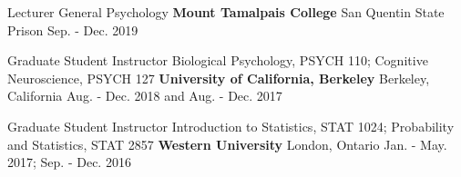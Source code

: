

\begin{cventries}

  \cventry
    {Lecturer} %
    {General Psychology} %
    {\textbf{Mount Tamalpais College}} %
    {San Quentin State Prison} %
    {Sep. - Dec. 2019} %
    
  \cventry
	{Graduate Student Instructor} %
	{Biological Psychology, PSYCH 110; Cognitive Neuroscience, PSYCH 127} %
    {\textbf{University of California, Berkeley}} %
    {Berkeley, California} %
    {Aug. - Dec. 2018 and Aug. - Dec. 2017} %
    
  \cventry
	{Graduate Student Instructor} %
	{Introduction to Statistics, STAT 1024; Probability and Statistics, STAT 2857} %
    {\textbf{Western University}} %
    {London, Ontario} %
    {Jan. - May. 2017; Sep. - Dec. 2016} %
    
\end{cventries}

